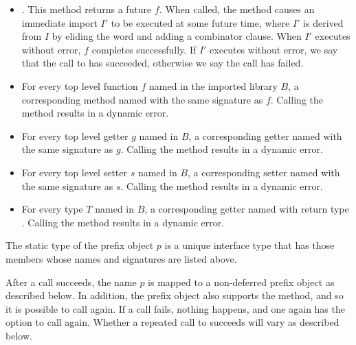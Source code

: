 \documentclass[makeidx]{article}
\begin{document}
{\begin{itemize}
\item {}.
This method returns a future $f$.
When called, the method causes an immediate import $I'$ to be executed at some future time, where $I'$ is derived from $I$ by eliding the word \DEFERRED{} and adding a \HIDE{}  combinator clause.
When $I'$ executes without error, $f$ completes successfully.
If $I'$ executes without error, we say that the call to  has succeeded, otherwise we say the call has failed.
\item
  For every top level function $f$ named \id{} in the imported library $B$,
  a corresponding method named \id{} with the same signature as $f$.
  Calling the method results in a dynamic error.
\item
  For every top level getter $g$ named \id{} in $B$,
  a corresponding getter named \id{} with the same signature as $g$.
  Calling the method results in a dynamic error.
\item
  For every top level setter $s$ named \id{} in $B$,
  a corresponding setter named \id{} with the same signature as $s$.
  Calling the method results in a dynamic error.
\item
  For every type $T$ named \id{} in $B$,
  a corresponding getter named \id{} with return type .
  Calling the method results in a dynamic error.
\end{itemize}


The static type of the prefix object $p$ is a unique interface type that has those members whose names and signatures are listed above.

\LMHash{}%
After a call succeeds, the name $p$ is mapped to a non-deferred prefix object as described below.
In addition, the prefix object also supports the  method, and so it is possible to call  again.
If a call fails, nothing happens, and one again has the option to call  again.
Whether a repeated call to  succeeds will vary as described below.

}
\end{document}
